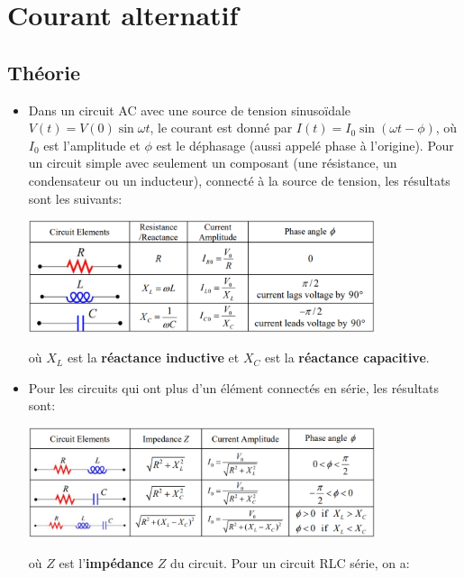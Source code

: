 \documentclass[a4paper]{article}
\begin{document}
\section{Courant alternatif}









\subsection{Théorie}








\begin{itemize}
    \item Dans un circuit AC avec une source de tension sinusoïdale $ V(t) = V(0) \sin \omega t $, le courant est donné par 
$ I(t) = I_0 \sin (\omega t - \phi) $, où $ I_0 $ est l'amplitude et $ \phi $ est le déphasage (aussi appelé phase à l'origine). Pour un circuit simple avec seulement un composant (une résistance, un condensateur ou un inducteur), connecté à la source de tension, les résultats sont les suivants: 
\begin{center}
\includegraphics[width=0.8\textwidth]{ac1.PNG}
\end{center}
où $ X_L $ est la \textbf{réactance inductive} et $ X_C $ est la \textbf{réactance capacitive}.
    \item Pour les circuits qui ont plus d'un élément connectés en série, les résultats sont: 
\begin{center}
\includegraphics[width=0.8\textwidth]{ac2.PNG}
\end{center}
où $ Z $ est l'\textbf{impédance} $ Z $ du circuit. Pour un circuit RLC série, on a: 

\end{itemize}
\end{document}
